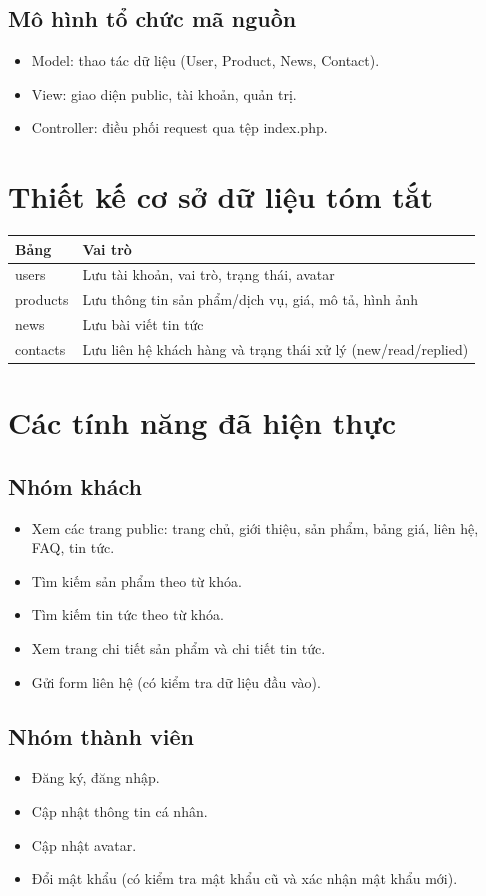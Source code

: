 \documentclass[12pt,a4paper]{article}
\begin{document}
\subsection{Mô hình tổ chức mã nguồn}
\begin{itemize}
  \item Model: thao tác dữ liệu (User, Product, News, Contact).
  \item View: giao diện public, tài khoản, quản trị.
  \item Controller: điều phối request qua tệp index.php.
\end{itemize}

\section{Thiết kế cơ sở dữ liệu tóm tắt}
\begin{longtable}{p{}p{}}
\toprule
Bảng & Vai trò \\
\midrule
users & Lưu tài khoản, vai trò, trạng thái, avatar \\
products & Lưu thông tin sản phẩm/dịch vụ, giá, mô tả, hình ảnh \\
news & Lưu bài viết tin tức \\
contacts & Lưu liên hệ khách hàng và trạng thái xử lý (new/read/replied) \\
\bottomrule
\end{longtable}

\section{Các tính năng đã hiện thực}

\subsection{Nhóm khách}
\begin{itemize}
  \item Xem các trang public: trang chủ, giới thiệu, sản phẩm, bảng giá, liên hệ, FAQ, tin tức.
  \item Tìm kiếm sản phẩm theo từ khóa.
  \item Tìm kiếm tin tức theo từ khóa.
  \item Xem trang chi tiết sản phẩm và chi tiết tin tức.
  \item Gửi form liên hệ (có kiểm tra dữ liệu đầu vào).
\end{itemize}

\subsection{Nhóm thành viên}
\begin{itemize}
  \item Đăng ký, đăng nhập.
  \item Cập nhật thông tin cá nhân.
  \item Cập nhật avatar.
  \item Đổi mật khẩu (có kiểm tra mật khẩu cũ và xác nhận mật khẩu mới).
\end{itemize}
\end{document}

